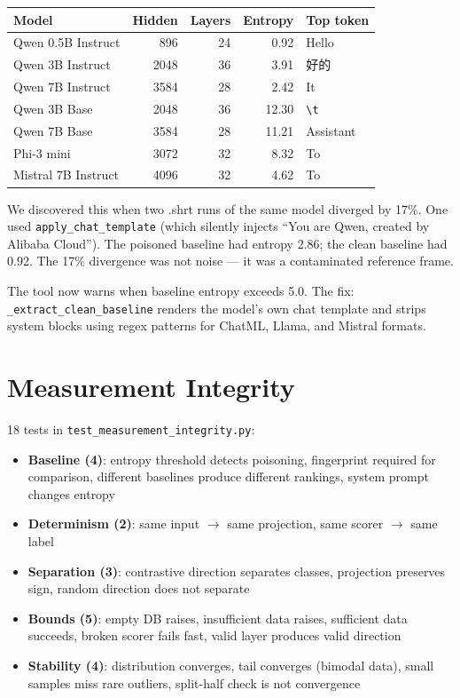 \documentclass[11pt,a4paper]{article}
\begin{document}
\begin{center}
\begin{tabular}{lrrrl}
\toprule
\textbf{Model} & \textbf{Hidden} & \textbf{Layers} & \textbf{Entropy} & \textbf{Top token} \\
\midrule
Qwen 0.5B Instruct & 896 & 24 & 0.92 & Hello \\
Qwen 3B Instruct & 2048 & 36 & 3.91 & 好的 \\
Qwen 7B Instruct & 3584 & 28 & 2.42 & It \\
Qwen 3B Base & 2048 & 36 & 12.30 & \texttt{\textbackslash t} \\
Qwen 7B Base & 3584 & 28 & 11.21 & Assistant \\
Phi-3 mini & 3072 & 32 & 8.32 & To \\
Mistral 7B Instruct & 4096 & 32 & 4.62 & To \\
\bottomrule
\end{tabular}
\end{center}

We discovered this when two .shrt runs of the same model diverged by 17\%. One used \texttt{apply\_chat\_template} (which silently injects ``You are Qwen, created by Alibaba Cloud''). The poisoned baseline had entropy 2.86; the clean baseline had 0.92. The 17\% divergence was not noise --- it was a contaminated reference frame.

The tool now warns when baseline entropy exceeds 5.0. The fix: \texttt{\_extract\_clean\_baseline} renders the model's own chat template and strips system blocks using regex patterns for ChatML, Llama, and Mistral formats.

\section{Measurement Integrity}

18 tests in \texttt{test\_measurement\_integrity.py}:

\begin{itemize}[nosep]
\item \textbf{Baseline (4)}: entropy threshold detects poisoning, fingerprint required for comparison, different baselines produce different rankings, system prompt changes entropy
\item \textbf{Determinism (2)}: same input $\to$ same projection, same scorer $\to$ same label
\item \textbf{Separation (3)}: contrastive direction separates classes, projection preserves sign, random direction does not separate
\item \textbf{Bounds (5)}: empty DB raises, insufficient data raises, sufficient data succeeds, broken scorer fails fast, valid layer produces valid direction
\item \textbf{Stability (4)}: distribution converges, tail converges (bimodal data), small samples miss rare outliers, split-half check is not convergence
\end{itemize}
\end{document}
